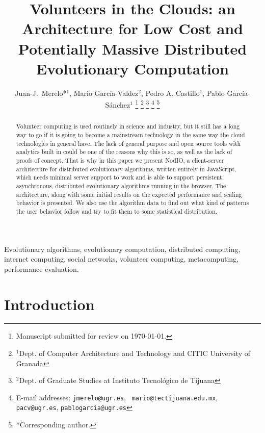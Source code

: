 \documentclass[journal,onecolumn]{IEEEtran}
\begin{document}
\title{Volunteers in the Clouds: an Architecture for Low Cost and
  Potentially Massive Distributed Evolutionary Computation}

\author{Juan-J.~Merelo*$^1$, Mario Garc\'ia-Valdez$^2$, Pedro A. Castillo$^1$, Pablo Garc\'ia-S\'anchez$^1$
\thanks{Manuscript submitted for review on \today.}%
\thanks{$^1$Dept. of Computer Architecture and Technology and CITIC University of Granada}%
\thanks{$^2$Dept. of Graduate Studies at Instituto Tecnol\'ogico de Tijuana}%
\thanks{E-mail addresses: {\tt jmerelo@ugr.es}, {\tt
    mario@tectijuana.edu.mx}, {\tt pacv@ugr.es}, {\tt pablogarcia@ugr.es}}%
\thanks{*Corresponding author.}%
}

\maketitle

\begin{abstract}
Volunteer computing is used routinely in science and industry, but it
still has a long way to go if it is going to become a mainstream technology in the
same way the cloud technologies in general have. The lack of general
purpose and open source tools
with analytics built in could be one of the reasons why this is so, as
well as the lack of proofs of concept. That is why in this paper we
present {\sf NodIO}, a client-server architecture for distributed
evolutionary algorithms, written entirely in JavaScript, which needs
minimal server support to work and is able to support persistent,
asynchronous, distributed evolutionary algorithms running in the
browser. The architecture, along with some initial results on the
expected performance and scaling
behavior is presented. We also use the algorithm data to
find out what kind of patterns the user behavior follow and try to fit
them to some statistical distribution.
\end{abstract}

\begin{IEEEkeywords}
Evolutionary algorithms, evolutionary computation, distributed computing, internet computing,
social networks, volunteer computing, metacomputing, performance evaluation.
\end{IEEEkeywords}

\section{Introduction}
\end{document}
